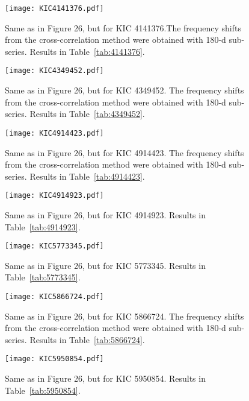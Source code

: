 \documentclass[twocolumn]{aastex61}%
\begin{document}
\begin{figure}[ht]
\texttt{[image: KIC4141376.pdf]}\vspace{-0.2cm}
\caption{Same as in Figure 26, but for KIC 4141376.The frequency shifts from the cross-correlation method were obtained with 180-d sub-series. Results in Table~\ref{tab:4141376}.}\label{fig:4141376}
\end{figure}


\begin{figure}[ht]
\texttt{[image: KIC4349452.pdf]}\vspace{-0.2cm}
\caption{Same as in Figure 26, but for KIC 4349452. The frequency shifts from the cross-correlation method were obtained with 180-d sub-series. Results in Table~\ref{tab:4349452}.}\label{fig:4349452}\vspace{-1.5cm}
\end{figure}

\begin{figure}[ht]
\texttt{[image: KIC4914423.pdf]}
\caption{Same as in Figure 26, but for KIC 4914423. The frequency shifts from the cross-correlation method were obtained with 180-d sub-series. Results in Table~\ref{tab:4914423}.}\label{fig:4914423}
\end{figure}

\begin{figure}[ht]
\texttt{[image: KIC4914923.pdf]}
\caption{Same as in Figure 26, but for KIC 4914923. Results in Table~\ref{tab:4914923}.}\label{fig:4914923}
\end{figure}

\begin{figure}[ht]
\texttt{[image: KIC5773345.pdf]}
\caption{Same as in Figure 26, but for KIC 5773345. Results in Table~\ref{tab:5773345}.}\label{fig:5773345}
\end{figure}

\FloatBarrier
\nopagebreak
\begin{figure}[ht]
\texttt{[image: KIC5866724.pdf]}\vspace{-0.3cm}
\caption{Same as in Figure 26, but for KIC 5866724. The frequency shifts from the cross-correlation method were obtained with 180-d sub-series. Results in Table~\ref{tab:5866724}.}\label{fig:5866724}\vspace{-0.3cm}
\end{figure}

\begin{figure}[ht]
\texttt{[image: KIC5950854.pdf]}\vspace{-0.3cm}
\caption{Same as in Figure 26, but for KIC 5950854. Results in Table~\ref{tab:5950854}.}\label{fig:5950854}\vspace{-1.8cm}
\end{figure}
\end{document}
